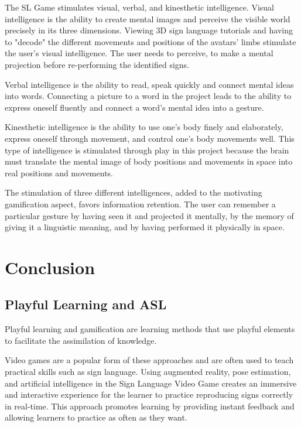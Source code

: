 The SL Game stimulates visual, verbal, and kinesthetic intelligence. 
Visual intelligence is the ability to create mental images and perceive the visible world precisely in its three dimensions. Viewing 3D sign language tutorials and having to "decode" the different movements and positions of the avatars' limbs stimulate the user's visual intelligence. The user needs to perceive, to make a mental projection before re-performing the identified signs.

Verbal intelligence is the ability to read, speak quickly and connect mental ideas into words. Connecting a picture to a word in the project leads to the ability to express oneself fluently and connect a word's mental idea into a gesture. 

Kinesthetic intelligence is the ability to use one's body finely and elaborately, express oneself through movement, and control one's body movements well. This type of intelligence is stimulated through play in this project because the brain must translate the mental image of body positions and movements in space into real positions and movements. 

The stimulation of three different intelligences, added to the motivating gamification aspect, favors information retention. The user can remember a particular gesture by having seen it and projected it mentally, by the memory of giving it a linguistic meaning, and by having performed it physically in space.

\section{Conclusion}

\subsection{Playful Learning and ASL}

Playful learning and gamification are learning methods that use playful elements to facilitate the assimilation of knowledge. 

Video games are a popular form of these approaches and are often used to teach practical skills such as sign language. Using augmented reality, pose estimation, and artificial intelligence in the Sign Language Video Game creates an immersive and interactive experience for the learner to practice reproducing signs correctly in real-time. 
This approach promotes learning by providing instant feedback and allowing learners to practice as often as they want. 


